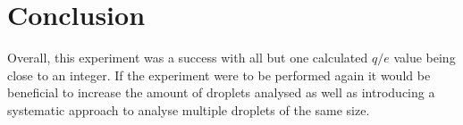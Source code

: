 \documentclass{article}
\begin{document}
\section{Conclusion}
Overall, this experiment was a success with all but one calculated $q/e$ value  being close to an integer. If the experiment were to be performed again it would be beneficial to increase the amount of droplets analysed as well as introducing a systematic approach to analyse multiple droplets of the same size.


\printbibliography
\end{document}
